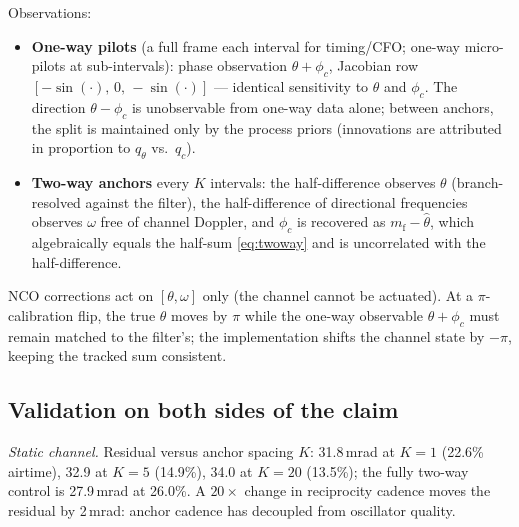 \documentclass[10pt]{article}
\begin{document}
Observations:
\begin{itemize}
\item \textbf{One-way pilots} (a full frame each interval for
timing/CFO; one-way micro-pilots at sub-intervals): phase observation
$\theta+\phi_c$, Jacobian row $[-\sin(\cdot),\,0,\,-\sin(\cdot)]$ ---
identical sensitivity to $\theta$ and $\phi_c$. The direction
$\theta-\phi_c$ is unobservable from one-way data alone; between
anchors, the split is maintained only by the process priors (innovations
are attributed in proportion to $q_\theta$ vs.\ $q_c$).
\item \textbf{Two-way anchors} every $K$ intervals: the half-difference
observes $\theta$ (branch-resolved against the filter), the
half-difference of directional frequencies observes $\omega$ free of
channel Doppler, and $\phi_c$ is recovered as
$m_{\mathrm f}-\hat\theta$, which algebraically equals the half-sum
\eqref{eq:twoway} and is uncorrelated with the half-difference.
\end{itemize}
NCO corrections act on $[\theta,\omega]$ only (the channel cannot be
actuated). At a $\pi$-calibration flip, the true $\theta$ moves by
$\pi$ while the one-way observable $\theta+\phi_c$ must remain matched to
the filter's; the implementation shifts the channel state by $-\pi$,
keeping the tracked sum consistent.

\subsection{Validation on both sides of the claim}
\emph{Static channel.} Residual versus anchor spacing $K$: 31.8\,mrad at
$K{=}1$ (22.6\% airtime), 32.9 at $K{=}5$ (14.9\%), 34.0 at $K{=}20$
(13.5\%); the fully two-way control is 27.9\,mrad at 26.0\%. A
$20\times$ change in reciprocity cadence moves the residual by 2\,mrad:
anchor cadence has decoupled from oscillator quality.
\end{document}
